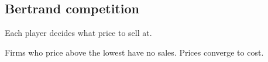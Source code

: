 
\subsection{Bertrand competition}

Each player decides what price to sell at.

Firms who price above the lowest have no sales. Prices converge to cost.

